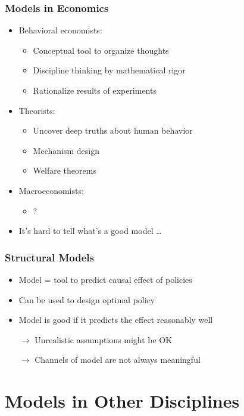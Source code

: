 \documentclass[11pt]{beamer}
\begin{document}
\begin{frame}[c]\frametitle{Models in Economics}
    \begin{itemize}
        \item Behavioral economists:
        \begin{itemize}
            \item Conceptual tool to organize thoughts
            \item Discipline thinking by mathematical rigor
            \item Rationalize results of experiments
        \end{itemize}
        \item Theorists:
        \begin{itemize}
            \item Uncover deep truths about human behavior
            \item Mechanism design
            \item Welfare theorems
        \end{itemize}
        \item Macroeconomists:
        \begin{itemize}
            \item ?
        \end{itemize}
        \item It's hard to tell what's a good model \ldots
    \end{itemize}
\end{frame}


\begin{frame}[c]\frametitle{Structural Models}
    \begin{itemize}
        \item Model = tool to predict causal effect of policies
        \item Can be used to design optimal policy
        \item Model is good if it predicts the effect reasonably well
        \item [$\rightarrow$] Unrealistic assumptions might be OK
        \item [$\rightarrow$] Channels of model are not always meaningful
    \end{itemize}
\end{frame}




\section{Models in Other Disciplines}
\end{document}
